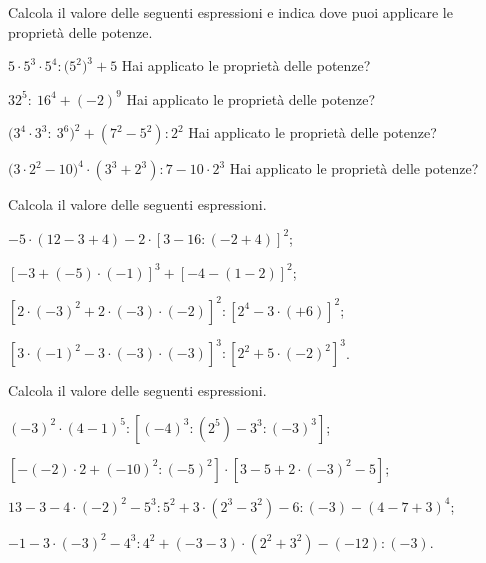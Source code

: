 \begin{esercizio}[\Ast]
Calcola il valore delle seguenti espressioni e indica dove puoi applicare le proprietà delle potenze.
\TabPositions{5.5cm}
\begin{enumeratea}
 \item $5\cdot 5^3\cdot 5^4: \big(5^2\big)^3 +5$ \tab Hai applicato le proprietà delle potenze?\:\dotfill
 \item $32^5:~16^4 +(-2)^9$ \tab Hai applicato le proprietà delle potenze?\:\dotfill
 \item $\big(3^4\cdot 3^3:~3^6\big)^2 +\left(7^2-5^2\right):2^2$ \tab Hai applicato le proprietà delle potenze?\:\dotfill
 \item $\big(3\cdot 2^2 -10\big)^4\cdot \left(3^3+2^3\right):7-10\cdot 2^3$ \tab Hai applicato le proprietà delle potenze?\:\dotfill
\end{enumeratea}
\end{esercizio}
\pagebreak
\begin{esercizio}[\Ast]
Calcola il valore delle seguenti espressioni.
 \begin{enumeratea}
 \item $-5\cdot(12-3+4)-2\cdot\left[3-16:(-2+4)\right]^2$;
 \item $\left[-3+(-5)\cdot(-1)\right]^3+\left[-4-(1-2)\right]^2$;
 \item $\left[2\cdot(-3)^2+2\cdot(-3)\cdot(-2)\right]^2:\left[2^4-3\cdot(+6)\right]^2$;
 \item $\left[3\cdot(-1)^2-3\cdot(-3)\cdot(-3)\right]^3:\left[2^2+5\cdot(-2)^2\right]^3$.
 \end{enumeratea}
\end{esercizio}

\begin{esercizio}[\Ast]
Calcola il valore delle seguenti espressioni.
 \begin{enumeratea}
 \item $(-3)^2\cdot(4-1)^5:\left[(-4)^3:\left(2^5\right)-3^3:(-3)^3\right]$;
 \item $\left[-(-2)\cdot2+(-10)^2:(-5)^2\right]\cdot\left[3-5+2\cdot(-3)^2-5\right]$;
 \item $13-3-4\cdot(-2)^2-5^3:5^2+3\cdot\left(2^3-3^2\right)-6:(-3)-(4-7+3)^4$;
 \item $-1-3\cdot(-3)^2-4^3:4^2+(-3-3)\cdot\left(2^2+3^2\right)-(-12):(-3)$.
 \end{enumeratea}
\end{esercizio}

